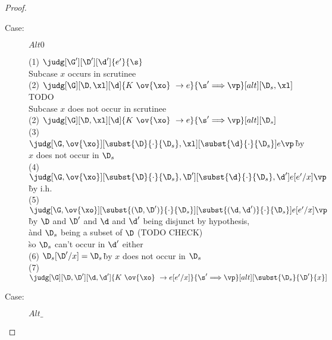 \begin{proof}
\begin{description}
\item[Case:] $Alt0$
\begin{tabbing}
  (1) $\judg[\G'][\D'][\d']{e'}{\s}$\\
  Subcase $x$ occurs in scrutinee\\
  (2) $\judg[\G][\D,\xl][\d]{K~\ov{\xo}~\to e}{\s' \Longrightarrow \vp}[alt][\D_s,\xl]$\\
  TODO\\
  Subcase $x$ does not occur in scrutinee\\
    (2) $\judg[\G][\D,\xl][\d]{K~\ov{\xo}~\to e}{\s' \Longrightarrow \vp}[alt][\D_s]$\\
    (3) $\judg[\G,\ov{\xo}][\subst{\D}{\cdot}{\D_s},\xl][\subst{\d}{\cdot}{\D_s}]{e}{\vp}$\`by $x$ does not occur in $\D_s$\\
    (4) $\judg[\G,\ov{\xo}][\subst{\D}{\cdot}{\D_s},\D'][\subst{\d}{\cdot}{\D_s},\d']{e[e'/x]}{\vp}$\`by i.h.\\
    (5) $\judg[\G,\ov{\xo}][\subst{(\D,\D')}{\cdot}{\D_s}][\subst{(\d,\d')}{\cdot}{\D_s}]{e[e'/x]}{\vp}$\\
    \`by $\D$ and $\D'$ and $\d$ and $\d'$ being disjunct by hypothesis,\\
    \`and $\D_s$ being a subset of $\D$ (TODO CHECK)\\
    \`so $\D_s$ can't occur in $\d'$ either\\
    (6) $\D_s[\D'/x] = \D_s$\`by $x$ does not occur in $\D_s$\\
    (7) $\judg[\G][\D,\D'][\d,\d']{K~\ov{\xo}~\to e[e'/x]}{\s' \Longrightarrow \vp}[alt][\subst{\D_s}{\D'}{x}]$\\
\end{tabbing}

\item[Case:] $Alt\_$
\begin{tabbing}
\end{tabbing}

\end{description}

\end{proof}

